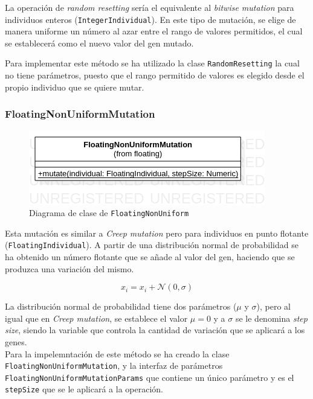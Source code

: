 La operación de \textit{random resetting} sería el equivalente al \textit{bitwise mutation} para individuos enteros (\texttt{IntegerIndividual}). En este tipo de mutación, se elige de manera uniforme un número al azar entre el rango de valores permitidos, el cual se establecerá como el nuevo valor del gen mutado.

Para implementar este método se ha utilizado la clase \texttt{RandomResetting} la cual no tiene parámetros, puesto que el rango permitido de valores es elegido desde el propio individuo que se quiere mutar.

\subsubsection{FloatingNonUniformMutation}

\begin{figure}[ht]
    \centering
    \includegraphics[scale=0.4]{mem/images/cap-4/4.2.7(Mutation)/FloatingNonUniformMutation.png}
    \caption{Diagrama de clase de \texttt{FloatingNonUniform}}
    \label{fig:my_label}
\end{figure}

Esta mutación es similar a \textit{Creep mutation} pero para individuos en punto flotante (\texttt{FloatingIndividual}). A partir de una distribución normal de probabilidad se ha obtenido un número flotante que se añade al valor del gen, haciendo que se produzca una variación del mismo.

\begin{equation}
    x_i = x_i + \mathcal{N}(0, \sigma)
\end{equation}

La distribución normal de probabilidad tiene dos parámetros ($\mu$ y $\sigma$), pero al igual que en \textit{Creep mutation}, se establece el valor $\mu = 0$ y a $\sigma$ se le denomina \textit{step size}, siendo la variable que controla la cantidad de variación que se aplicará a los genes. \\

Para la impelemntación de este método se ha creado la clase \texttt{FloatingNonUniformMutation}, y la interfaz de parámetros \texttt{FloatingNonUniformMutationParams} que contiene un único parámetro y es el \texttt{stepSize} que se le aplicará a la operación.


